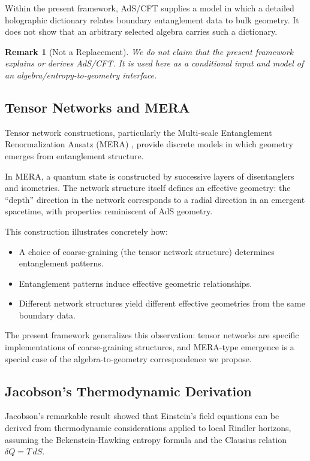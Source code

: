 \documentclass[12pt,a4paper]{article}
\newtheorem{remark}[theorem]{Remark}
\begin{document}
Within the present framework, AdS/CFT supplies a model in which a detailed holographic dictionary relates boundary entanglement data to bulk geometry.  It does not show that an arbitrary selected algebra carries such a dictionary.

\begin{remark}[Not a Replacement]
We do not claim that the present framework explains or derives AdS/CFT.  It is used here as a conditional input and model of an algebra/entropy-to-geometry interface.
\end{remark}

\subsection{Tensor Networks and MERA}

Tensor network constructions, particularly the Multi-scale Entanglement Renormalization Ansatz (MERA) \cite{Vidal2008,Swingle2012}, provide discrete models in which geometry emerges from entanglement structure.

In MERA, a quantum state is constructed by successive layers of disentanglers and isometries. The network structure itself defines an effective geometry: the ``depth'' direction in the network corresponds to a radial direction in an emergent spacetime, with properties reminiscent of AdS geometry.

This construction illustrates concretely how:
\begin{itemize}
    \item A choice of coarse-graining (the tensor network structure) determines entanglement patterns.
    \item Entanglement patterns induce effective geometric relationships.
    \item Different network structures yield different effective geometries from the same boundary data.
\end{itemize}

The present framework generalizes this observation: tensor networks are specific implementations of coarse-graining structures, and MERA-type emergence is a special case of the algebra-to-geometry correspondence we propose.

\subsection{Jacobson's Thermodynamic Derivation}

Jacobson's remarkable result \cite{Jacobson1995} showed that Einstein's field equations can be derived from thermodynamic considerations applied to local Rindler horizons, assuming the Bekenstein-Hawking entropy formula and the Clausius relation $\delta Q = T \, dS$.
\end{document}
